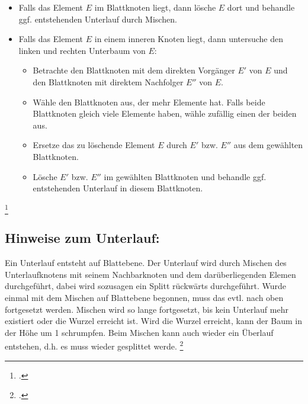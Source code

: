 \documentclass{lehramt-informatik-haupt}
\begin{document}
\begin{itemize}
\item Falls das Element $E$ im Blattknoten liegt, dann lösche $E$ dort
und behandle ggf. entstehenden Unterlauf durch Mischen.

\item Falls das Element $E$ in einem inneren Knoten liegt, dann
untersuche den linken und rechten Unterbaum von $E$:

\begin{itemize}
\item Betrachte den Blattknoten mit dem direkten Vorgänger $E'$ von $E$
und den Blattknoten mit direktem Nachfolger $E''$ von $E$.

\item Wähle den Blattknoten aus, der mehr Elemente hat. Falls beide
Blattknoten gleich viele Elemente haben, wähle zufällig einen der beiden
aus.

\item Ersetze das zu löschende Element $E$ durch $E'$ bzw. $E''$ aus dem
gewählten Blattknoten.

\item Lösche $E'$ bzw. $E''$ im gewählten Blattknoten und behandle ggf.
entstehenden Unterlauf in diesem Blattknoten.
\end{itemize}
\end{itemize}
\footcite[Seite 39]{aud:fs:5}

\subsection{Hinweise zum Unterlauf:}

Ein Unterlauf entsteht auf Blattebene. Der Unterlauf wird durch Mischen
des Unterlaufknotens mit seinem Nachbarknoten und dem darüberliegenden
Elemen  durchgeführt, dabei wird sozusagen ein Splitt rückwärts
durchgeführt. Wurde einmal mit dem Mischen auf Blattebene begonnen, muss
das evtl. nach oben fortgesetzt werden. Mischen wird so lange
fortgesetzt, bis kein Unterlauf mehr existiert oder die Wurzel erreicht
ist. Wird die Wurzel erreicht, kann der Baum in der Höhe um 1
schrumpfen. Beim Mischen kann auch wieder ein Überlauf entstehen, d.h.
es muss wieder gesplittet werde.
\footcite[Seite 40]{aud:fs:5}


\literatur
\end{document}
